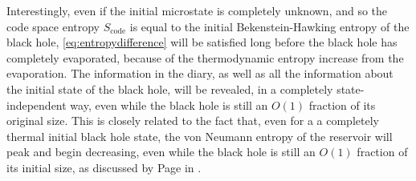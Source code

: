 \documentclass[11pt,a4paper]{article}
\begin{document}
Interestingly, even if the initial microstate is completely unknown, and so the code space entropy $S_\text{code}$ is equal to the initial Bekenstein-Hawking entropy of the black hole, \eqref{eq:entropydifference} will be satisfied long before the black hole has completely evaporated, because of the thermodynamic entropy increase from the evaporation. The information in the diary, as well as all the information about the initial state of the black hole, will be revealed, in a completely state-independent way, even while the black hole is still an $O(1)$ fraction of its original size. This is closely related to the fact that, even for a a completely thermal initial black hole state, the von Neumann entropy of the reservoir will peak and begin decreasing, even while the black hole is still an $O(1)$ fraction of its initial size, as discussed by Page in \cite{page2013time}.
\end{document}
